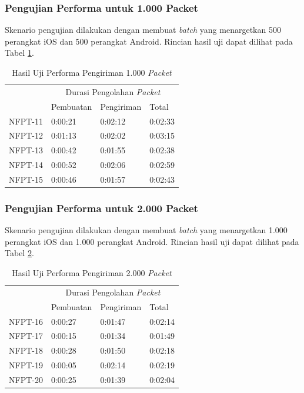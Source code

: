 \subsubsection{Pengujian Performa untuk 1.000 Packet}
\par Skenario pengujian dilakukan dengan membuat \textit{batch} yang menargetkan 500 perangkat iOS dan 500 perangkat Android. Rincian hasil uji dapat dilihat pada Tabel \ref{t:performa-1k}.

\begin{longtable}{|p{1.5cm}|p{2cm}|p{2cm}|p{2cm}|}
	\caption{Hasil Uji Performa Pengiriman 1.000 \textit{Packet}} \label{t:performa-1k} \\ \hline
	\rowcolor{lightgray} & \multicolumn{3}{c|}{Durasi Pengolahan \textit{Packet}} \\ \hhline{~|*3{-}|}
	\rowcolor{lightgray} \multirow{-2}{*}{Kode} & Pembuatan & Pengiriman & Total \\ \hline
	\endhead
	NFPT-11 & 0:00:21 & 0:02:12 & 0:02:33 \\ \hline 
	NFPT-12 & 0:01:13 & 0:02:02 & 0:03:15 \\ \hline
	NFPT-13 & 0:00:42 & 0:01:55 & 0:02:38 \\ \hline
	NFPT-14 & 0:00:52 & 0:02:06 & 0:02:59 \\ \hline
	NFPT-15 & 0:00:46 & 0:01:57 & 0:02:43 \\ \hline
\end{longtable}

\subsubsection{Pengujian Performa untuk 2.000 Packet}
\par Skenario pengujian dilakukan dengan membuat \textit{batch} yang menargetkan 1.000 perangkat iOS dan 1.000 perangkat Android. Rincian hasil uji dapat dilihat pada Tabel \ref{t:performa-2k}.

\begin{longtable}{|p{1.5cm}|p{2cm}|p{2cm}|p{2cm}|}
	\caption{Hasil Uji Performa Pengiriman 2.000 \textit{Packet}} \label{t:performa-2k} \\ \hline
	\rowcolor{lightgray} & \multicolumn{3}{c|}{Durasi Pengolahan \textit{Packet}} \\ \hhline{~|*3{-}|}
	\rowcolor{lightgray} \multirow{-2}{*}{Kode} & Pembuatan & Pengiriman & Total \\ \hline
	\endhead
	NFPT-16 & 0:00:27 & 0:01:47 & 0:02:14 \\ \hline 
	NFPT-17 & 0:00:15 & 0:01:34 & 0:01:49 \\ \hline
	NFPT-18 & 0:00:28 & 0:01:50 & 0:02:18 \\ \hline
	NFPT-19 & 0:00:05 & 0:02:14 & 0:02:19 \\ \hline
	NFPT-20 & 0:00:25 & 0:01:39 & 0:02:04 \\ \hline
\end{longtable}

